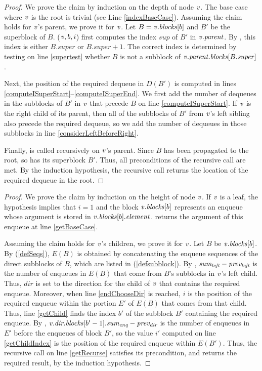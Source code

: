 \indexDequeueRes*
\begin{proof}
We prove the claim by induction on the depth of node $\mbox{\textnormal{\textit{v}}}$. The base case where $\mbox{\textnormal{\textit{v}}}$ is the root is trivial (see Line \ref{indexBaseCase}).
Assuming the claim holds for $\mbox{\textnormal{\textit{v}}}$'s parent, we prove it for $\mbox{\textnormal{\textit{v}}}$.
Let $B=\mbox{\textnormal{\textit{v}}}.\mbox{\textit{blocks}}[b]$ and $B'$ be the superblock of $B$.
($\mbox{\textnormal{\textit{v}}}, b, i$) first computes the index $sup$ of $B'$ in $\mbox{\textnormal{\textit{v}}}.\mbox{\textit{parent}}$.
By , this index is either $B.super$ or $B.super+1$.
The correct index is determined by testing on line \ref{supertest} whether $B$ is not a subblock of $\mbox{\textnormal{\textit{v}}}.\mbox{\textit{parent.blocks}}[B.\mbox{\textit{super}}]$.

Next, the position of the required dequeue in $D(B')$ is computed in 
lines \ref{computeISuperStart}--\ref{computeISuperEnd}. 
We first add the number of dequeues in the subblocks of $B'$ in $\mbox{\textnormal{\textit{v}}}$ that precede $B$ on line \ref{computeISuperStart}.
If $\mbox{\textnormal{\textit{v}}}$ is the right child of its parent, then all of the subblocks of $B'$ from $\mbox{\textnormal{\textit{v}}}$'s left sibling
also precede the required dequeue, so we add the number of dequeues in those subblocks in line \ref{considerLeftBeforeRight}.

Finally,  is called recursively on $\mbox{\textnormal{\textit{v}}}$'s parent.
Since $B$ has been propagated to the root, so has its superblock $B'$.
Thus, all preconditions of the recursive call are met.
By the induction hypothesis, the recursive call returns the location of the required dequeue in the root.\end{proof}

\getEnqRes*
\begin{proof}
We prove the claim by induction on the height of node $\mbox{\textnormal{\textit{v}}}$.
If $\mbox{\textnormal{\textit{v}}}$ is a leaf, the hypothesis implies that $i=1$ and the block $\mbox{\textnormal{\textit{v}}}.\mbox{\textit{blocks}}[b]$ represents 
an enqueue whose argument is stored in $\mbox{\textnormal{\textit{v}}}.\mbox{\textit{blocks}}[b].\mbox{\textit{element}}$.
 returns the argument of this enqueue at line \ref{getBaseCase}.

Assuming the claim holds for $\mbox{\textnormal{\textit{v}}}$'s children, we prove it for $\mbox{\textnormal{\textit{v}}}$.
Let $B$ be $\mbox{\textnormal{\textit{v}}}.\mbox{\textit{blocks}}[b]$.
By (\ref{defSeqs}),
$E(B)$ is obtained by concatenating the enqueue sequences of the direct subblocks
of $B$, which are listed in (\ref{defsubblock}).
By , $\mbox{\textnormal{\textit{sum\textsubscript{left}}}}-\mbox{\textnormal{\textit{prev\textsubscript{left}}}}$ is the number
of enqueues in $E(B)$ that come from $B$'s subblocks in $\mbox{\textnormal{\textit{v}}}$'s left child.
Thus, $dir$ is set to the direction for the child of $\mbox{\textnormal{\textit{v}}}$ that contains the required enqueue.
Moreover, when line \ref{endChooseDir} is reached, $i$ is the position of the required enqueue within the portion $E'$ of $E(B)$ that comes from that child.
Thus,  line \ref{getChild} finds the index $b'$ of the subblock $B'$ containing the required enqueue.
By , $\mbox{\textnormal{\textit{v}}}.\mbox{\textnormal{\textit{dir.blocks}}}[b'-1].\mbox{\textnormal{\textit{sum\textsubscript{enq}}}} - \mbox{\textnormal{\textit{prev\textsubscript{dir}}}}$ is the number of 
enqueues in $E'$ before the enqueues of block $B'$, so
the value $i'$ computed on line \ref{getChildIndex} is the position of the required enqueue within $E(B')$.
Thus, the recursive call on line \ref{getRecurse} satisfies its precondition, and 
returns the required result, by the induction hypothesis.
\end{proof}

